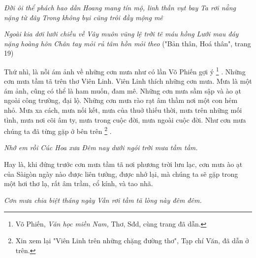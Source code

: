 \documentclass[../main.tex]{subfiles}
\begin{document}
\begin{multicols}{2}
\textit{Đời ôi thể phách hao dần} 
\textit{Hoang mang tín mộ, linh thần vụt bay} 
\textit{Ta rơi nằng nặng từ đây} 
\textit{Trong không bụi cũng trôi đầy mộng mê} 
 
\textit{Ngoài kia dơi lưới chiều về} 
\textit{Vây muôn vũng lệ trời tê máu hồng} 
\textit{Lưới mau đáy nặng hoàng hôn} 
\textit{Chân tay mỏi rủ tâm hồn mỏi theo} 
("Bản thân, Hoá thân", trang 19) 
 
Thứ nhì, là nỗi ám ảnh về những cơn mưa như có lần Võ Phiến gợi ý \footnote{
Võ Phiến, \textit{Văn học miền Nam, }Thơ, Sđd, cùng trang đã dẫn.} . Những cơn mưa tầm tã trên thơ Viên Linh. Viên Linh thích những cơn mưa. Mưa là một ám ảnh, cũng có thể là ham muốn, đam mê. Những cơn mưa sầm sập và ào ạt ngoài công trường, đại lộ. Những cơn mưa rào rạt âm thầm nơi một con hẻm nhỏ. Mưa xa cách, mưa nối kết, mưa của thuở thiếu thời, mưa trên những mối tình, mưa nơi cõi âm ty, mưa trong cuộc đời, mưa ngoài cuộc đời. Như cơn mưa chúng ta đã từng gặp ở bên trên \footnote{
Xin xem lại "Viên Linh trên những chặng đường thơ", Tạp chí Văn, đã dẫn ở trên.} . 
 
\textit{Nhớ em rồi Cúc Hoa xưa} 
\textit{Đêm nay dưới ngói trời mưa tầm tầm.} 
 
Hay là, khi đứng trước cơn mưa tầm tã nơi phương trời lưu lạc, cơn mưa ào ạt của Sàigòn ngày nào được liên tưởng, được nhớ lại, mà chúng ta sẽ gặp trong một hơi thơ lạ, rất âm trầm, cổ kính, và tao nhã. 
 
\textit{Cơn mưa chia biệt tháng ngày} 
\textit{Vẫn rơi tầm tã lòng này đêm đêm.} 
 

\end{multicols}
\end{document}
